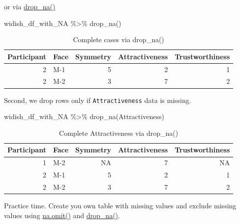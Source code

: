 \documentclass[
]{book}
\newenvironment{Shaded}{\begin{snugshade}}{\end{snugshade}}
\newcommand{\FunctionTok}[1]{\textcolor[rgb]{0.00,0.00,0.00}{#1}}
\newcommand{\NormalTok}[1]{#1}
\newcommand{\SpecialCharTok}[1]{\textcolor[rgb]{0.00,0.00,0.00}{#1}}
\begin{document}
or via \href{https://tidyr.tidyverse.org/reference/drop_na.html}{drop\_na()}

\begin{Shaded}
\begin{Highlighting}[]
\NormalTok{widish\_df\_with\_NA }\SpecialCharTok{\%\textgreater{}\%}
  \FunctionTok{drop\_na}\NormalTok{()}
\end{Highlighting}
\end{Shaded}

\begin{table}

\caption{\label{tab:unnamed-chunk-283}Complete cases via drop\_na()}
\centering
\begin{tabular}[t]{r|l|r|r|r}
\hline
Participant & Face & Symmetry & Attractiveness & Trustworthiness\\
\hline
2 & M-1 & 5 & 2 & 1\\
\hline
2 & M-2 & 3 & 7 & 2\\
\hline
\end{tabular}
\end{table}

Second, we drop rows only if \texttt{Attractiveness} data is missing.

\begin{Shaded}
\begin{Highlighting}[]
\NormalTok{widish\_df\_with\_NA }\SpecialCharTok{\%\textgreater{}\%}
  \FunctionTok{drop\_na}\NormalTok{(Attractiveness)}
\end{Highlighting}
\end{Shaded}

\begin{table}

\caption{\label{tab:unnamed-chunk-284}Complete Attractiveness via drop\_na()}
\centering
\begin{tabular}[t]{r|l|r|r|r}
\hline
Participant & Face & Symmetry & Attractiveness & Trustworthiness\\
\hline
1 & M-2 & NA & 7 & NA\\
\hline
2 & M-1 & 5 & 2 & 1\\
\hline
2 & M-2 & 3 & 7 & 2\\
\hline
\end{tabular}
\end{table}

Practice time. Create you own table with missing values and exclude missing values using \href{https://stat.ethz.ch/R-manual/R-devel/library/stats/html/na.fail.html}{na.omit()} and \href{https://tidyr.tidyverse.org/reference/drop_na.html}{drop\_na()}.
\end{document}
